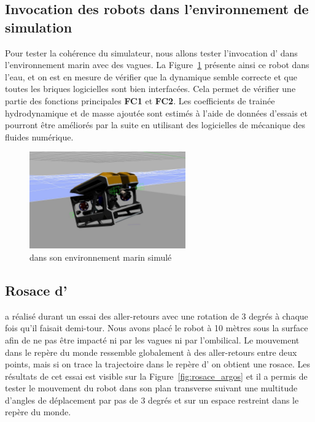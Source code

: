 		\subsection{Invocation des robots dans l'environnement de simulation}

			Pour tester la cohérence du simulateur, nous allons tester l'invocation d'\argos{} dans l'environnement marin avec des vagues. La Figure~\ref{fig:argos_sea} présente ainsi ce robot dans l'eau, et on est en mesure de vérifier que la dynamique semble correcte et que toutes les briques logicielles sont bien interfacées. Cela permet de vérifier une partie des fonctions principales \textbf{FC1} et \textbf{FC2}. Les coefficients de trainée hydrodynamique et de masse ajoutée sont estimés à l'aide de données d'essais et pourront être améliorés par la suite en utilisant des logicielles de mécanique des fluides numérique.

			\begin{figure}
				\centering
				\includegraphics[width=0.6\textwidth]{imgs/argos_gazebo_sea.jpg}
				\caption{\argos{} dans son environnement marin simulé}
				\label{fig:argos_sea}
			\end{figure}

		\subsection{Rosace d'\argos{}}

			\argos{} a réalisé durant un essai des aller-retours avec une rotation de 3 degrés à chaque fois qu'il faisait demi-tour. Nous avons placé le robot à 10 mètres sous la surface afin de ne pas être impacté ni par les vagues ni par l'ombilical. Le mouvement dans le repère du monde ressemble globalement à des aller-retours entre deux points, mais si on trace la trajectoire dans le repère d'\argos{} on obtient une rosace. Les résultats de cet essai est visible sur la Figure~\ref{fig:rosace_argos} et il a permis de tester le mouvement du robot dans son plan transverse suivant une multitude d'angles de déplacement par pas de 3 degrés et sur un espace restreint dans le repère du monde.

